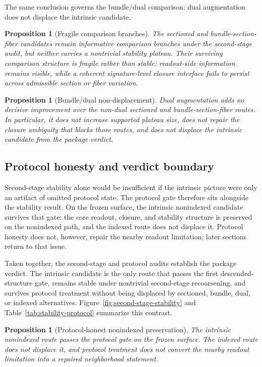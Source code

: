 \documentclass[11pt]{article}
\newtheorem{proposition}[theorem]{Proposition}
\theoremstyle{definition}
\begin{document}
The same conclusion governs the bundle/dual comparison: dual augmentation does not displace the intrinsic candidate.

\begin{proposition}[Fragile comparison branches]
\label{prop:fragile-branches}
The sectioned and bundle-section-fiber candidates remain informative comparison branches under the second-stage audit, but neither carries a nontrivial stability plateau. Their surviving comparison structure is fragile rather than stable: readout-side information remains visible, while a coherent signature-level closure interface fails to persist across admissible section or fiber variation.
\end{proposition}

\begin{proposition}[Bundle/dual non-displacement]
\label{prop:bundle-dual-nondisplacement}
Dual augmentation adds no decisive improvement over the non-dual sectioned and bundle-section-fiber routes. In particular, it does not increase supported plateau size, does not repair the closure ambiguity that blocks those routes, and does not displace the intrinsic candidate from the package verdict.
\end{proposition}

\subsection{Protocol honesty and verdict boundary}

Second-stage stability alone would be insufficient if the intrinsic picture were only an artifact of omitted protocol state. The protocol gate therefore sits alongside the stability result. On the frozen surface, the intrinsic nonindexed candidate survives that gate: the core readout, closure, and stability structure is preserved on the nonindexed path, and the indexed route does not displace it. Protocol honesty does not, however, repair the nearby readout limitation; later sections return to that issue.

Taken together, the second-stage and protocol audits establish the package verdict. The intrinsic candidate is the only route that passes the first descended-structure gate, remains stable under nontrivial second-stage recoarsening, and survives protocol treatment without being displaced by sectioned, bundle, dual, or indexed alternatives. Figure~\ref{fig:second-stage-stability} and Table~\ref{tab:stability-protocol} summarize this contrast.

\begin{proposition}[Protocol-honest nonindexed preservation]
\label{prop:protocol-honest-intrinsic}
The intrinsic nonindexed route passes the protocol gate on the frozen surface. The indexed route does not displace it, and protocol treatment does not convert the nearby readout limitation into a repaired neighborhood statement.
\end{proposition}
\end{document}
